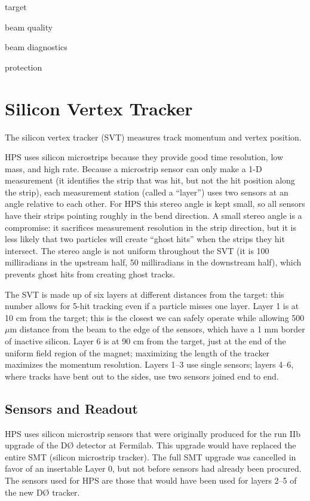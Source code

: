 target

beam quality

beam diagnostics

protection

\section{Silicon Vertex Tracker}
The silicon vertex tracker (SVT) measures track momentum and vertex position.

HPS uses silicon microstrips because they provide good time resolution, low mass, and high rate.
Because a microstrip sensor can only make a 1-D measurement (it identifies the strip that was hit, but not the hit position along the strip), each measurement station (called a ``layer'') uses two sensors at an angle relative to each other.
For HPS this stereo angle is kept small, so all sensors have their strips pointing roughly in the bend direction.
A small stereo angle is a compromise: it sacrifices measurement resolution in the strip direction, but it is less likely that two particles will create ``ghost hits'' when the strips they hit intersect.
The stereo angle is not uniform throughout the SVT (it is 100 milliradians in the upstream half, 50 milliradians in the downstream half), which prevents ghost hits from creating ghost tracks.

The SVT is made up of six layers at different distances from the target: this number allows for 5-hit tracking even if a particle misses one layer.
Layer 1 is at 10 cm from the target; this is the closest we can safely operate while allowing 500 $\mu$m distance from the beam to the edge of the sensors, which have a 1 mm border of inactive silicon.
Layer 6 is at 90 cm from the target, just at the end of the uniform field region of the magnet; maximizing the length of the tracker maximizes the momentum resolution.
Layers 1--3 use single sensors; layers 4--6, where tracks have bent out to the sides, use two sensors joined end to end.

\subsection{Sensors and Readout}
HPS uses silicon microstrip sensors that were originally produced for the run IIb upgrade of the D{\O} detector at Fermilab.
This upgrade would have replaced the entire SMT (silicon microstrip tracker).
The full SMT upgrade was cancelled in favor of an insertable Layer 0, but not before sensors had already been procured.
The sensors used for HPS are those that would have been used for layers 2--5 of the new D{\O} tracker.

